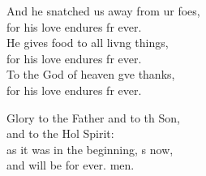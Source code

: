 \begin{psalmverse}
\begin{patverse}
And he snatched us away from ur foes,\Med\\
    for his love endures fr ever.\\
He gives food to all liv\pointup{\i}ng things,\Med\\
    for his love endures fr ever.\\
To the God of heaven g\pointup{\i}ve thanks,\Med\\
    for his love endures fr ever.

Glory to the Father and to th Son,\Med\\
    and to the Hol Spirit:\\
as it was in the beginning, \pointup{\i}s now,\Med\\
    and will be for ever. men.
  \end{patverse}
\end{psalmverse}
